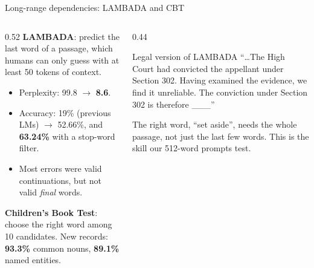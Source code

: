 \documentclass[aspectratio=169,11pt]{beamer}
\begin{document}
\begin{frame}{Long-range dependencies: LAMBADA and CBT}
  \begin{columns}[T]
    \begin{column}{0.52\textwidth}
      \small
      \textbf{LAMBADA}: predict the last word of a passage, which humans can only guess with at least 50 tokens of context.
      \begin{itemize}
        \item Perplexity: 99.8 $\to$ \textbf{8.6}.
        \item Accuracy: 19\% (previous LMs) $\to$ 52.66\%, and \textbf{63.24\%} with a stop-word filter.
        \item Most errors were valid continuations, but not valid \emph{final} words.
      \end{itemize}
      \vspace{1mm}
      \textbf{Children's Book Test}: choose the right word among 10 candidates. New records: \textbf{93.3\%} common nouns, \textbf{89.1\%} named entities.
    \end{column}
    \begin{column}{0.44\textwidth}
      \begin{exampleblock}{Legal version of LAMBADA}
        \small
        ``\ldots The High Court had convicted the appellant under Section 302. Having examined the evidence, we find it unreliable. The conviction under Section 302 is therefore \_\_\_''
        \vspace{1mm}

        The right word, ``set aside'', needs the whole passage, not just the last few words. This is the skill our 512-word prompts test.
      \end{exampleblock}
    \end{column}
  \end{columns}
\end{frame}
\end{document}
